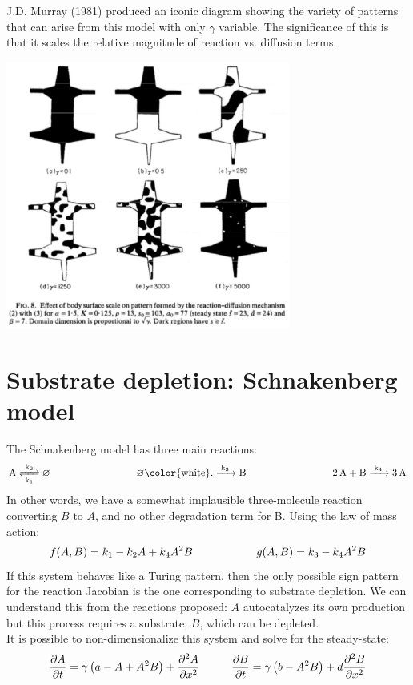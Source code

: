 \documentclass{article}
\begin{document}
J.D. Murray (1981) produced an iconic diagram showing the variety of patterns that can arise from this model with only $\gamma$ variable. The significance of this is that it scales the relative magnitude of reaction vs. diffusion terms.

\begin{center}
\includegraphics[width=0.7\textwidth]{thomas_murray.pdf}
\end{center}

\section*{Substrate depletion: Schnakenberg model}

The Schnakenberg model has three main reactions:
\[ \ce{A <=>[k_2][k_1] \varnothing } \hspace{3 cm} \ce{\varnothing {\color{white}.} ->[k_3] B} \hspace{3 cm} \ce{2A + B ->[k_4] 3 A} \]
In other words, we have a somewhat implausible three-molecule reaction converting $B$ to $A$, and no other degradation term for B. 
Using the law of mass action:
\[ f(A,B) = k_1  - k_2 A + k_4 A^2 B \hspace{2 cm} g(A,B) = k_3 - k_4 A^2 B \]
If this system behaves like a Turing pattern, then the only possible sign pattern for the reaction Jacobian is the one corresponding to substrate depletion. We can understand this from the reactions proposed: $A$ autocatalyzes its own production but this process requires a substrate, $B$, which can be depleted.\\

It is possible to non-dimensionalize this system and solve for the steady-state:
\[ \frac{\partial A}{\partial t} = \gamma \left( a  - A + A^2 B \right) + \frac{\partial^2 A}{\partial x^2} \hspace{1 cm} \frac{\partial B}{\partial t} = \gamma \left( b -  A^2 B \right) + d \frac{\partial^2 B}{\partial x^2}\]
\end{document}
